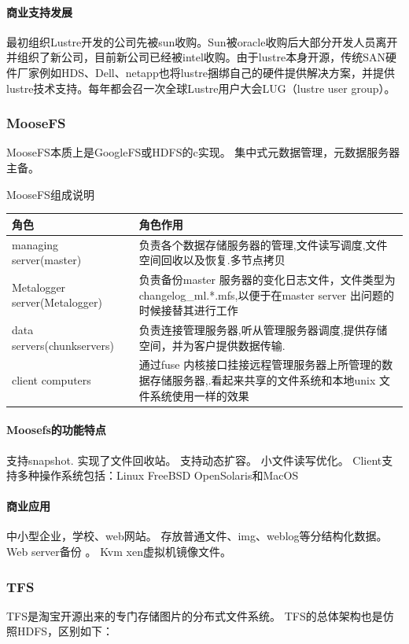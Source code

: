 \documentclass[UTF8]{ctexart}
\begin{document}
\paragraph{商业支持发展}
最初组织Lustre开发的公司先被sun收购。Sun被oracle收购后大部分开发人员离开并组织了新公司，目前新公司已经被intel收购。由于lustre本身开源，传统SAN硬件厂家例如HDS、Dell、netapp也将lustre捆绑自己的硬件提供解决方案，并提供lustre技术支持。每年都会召一次全球Lustre用户大会LUG（lustre user group）。

\subsubsection{MooseFS}
MooseFS本质上是GoogleFS或HDFS的c实现。
       集中式元数据管理，元数据服务器主备。

MooseFS组成说明

\begin{tabular}{p{3cm}p{8cm}}
\hline
角色 & 角色作用 \\
\hline
managing server(master) & 负责各个数据存储服务器的管理,文件读写调度,文件空间回收以及恢复.多节点拷贝\\
\hline
Metalogger server(Metalogger)& 负责备份master 服务器的变化日志文件，文件类型为changelog\_ml.*.mfs,以便于在master server 出问题的时候接替其进行工作\\
\hline
data servers(chunkservers) & 负责连接管理服务器,听从管理服务器调度,提供存储空间，并为客户提供数据传输.\\
\hline
client computers & 通过fuse 内核接口挂接远程管理服务器上所管理的数据存储服务器,.看起来共享的文件系统和本地unix 文件系统使用一样的效果\\
\hline
\end{tabular}

\paragraph{Moosefs的功能特点}
支持snapshot.
         实现了文件回收站。
         支持动态扩容。
         小文件读写优化。
         Client支持多种操作系统包括：Linux FreeBSD OpenSolaris和MacOS
\paragraph{商业应用}
中小型企业，学校、web网站。
存放普通文件、img、weblog等分结构化数据。
Web server备份 。
Kvm xen虚拟机镜像文件。

\subsubsection{TFS}
TFS是淘宝开源出来的专门存储图片的分布式文件系统。
TFS的总体架构也是仿照HDFS，区别如下：
\end{document}
